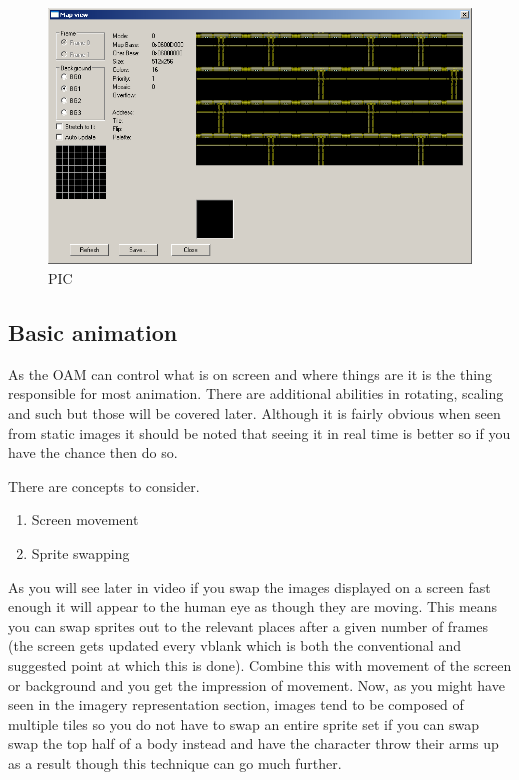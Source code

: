 \documentclass[
]{book}
\providecommand{\tightlist}{%
  \setlength{\itemsep}{0pt}\setlength{\parskip}{0pt}}
\begin{document}
\begin{figure}
\centering
\includegraphics{images/47_home_fast6191_romhackingguide_unrenamed_file___riginal_borders_romhackingguideBGlayering11.png}
\caption{PIC}
\end{figure}

\hypertarget{basic-animation}{%
\subsection{Basic animation}\label{basic-animation}}

As the OAM can control what is on screen and where things are it is the thing responsible for most animation. There are additional abilities in rotating, scaling and such but those will be covered later. Although it is fairly obvious when seen from static images it should be noted that seeing it in real time is better so if you have the chance then do so.

There are concepts to consider.

\begin{enumerate}
\def\labelenumi{\arabic{enumi}.}
\tightlist
\item
  Screen movement
\item
  Sprite swapping
\end{enumerate}

As you will see later in video if you swap the images displayed on a screen fast enough it will appear to the human eye as though they are moving. This means you can swap sprites out to the relevant places after a given number of frames (the screen gets updated every vblank which is both the conventional and suggested point at which this is done). Combine this with movement of the screen or background and you get the impression of movement. Now, as you might have seen in the imagery representation section, images tend to be composed of multiple tiles so you do not have to swap an entire sprite set if you can swap swap the top half of a body instead and have the character throw their arms up as a result though this technique can go much further.
\end{document}
